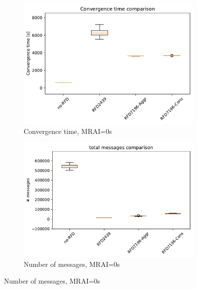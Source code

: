 \begin{figure}[H]
     \centering
     \begin{subfigure}[b]{0.325\textwidth}
         \centering
         \includegraphics[width=\textwidth]{images/RFD/miceVSelephants/MultiMRAI/0/elephants/cisco_1000MRAI0_rfd_comparison_time_boxplot.pdf}
         \caption{\scriptsize Convergence time, MRAI=0s}
         \label{fig:1000_RFD_MRAI0_time_elephant}
     \end{subfigure}
     \hfill
     \begin{subfigure}[b]{0.325\textwidth}
         \centering
         \includegraphics[width=\textwidth]{images/RFD/miceVSelephants/MultiMRAI/0/elephants/cisco_1000MRAI0_rfd_comparison_messages_boxplot.pdf}
         \caption{\scriptsize Number of messages, MRAI=0s}
         \label{fig:1000_RFD_MRAI0_messages_elephant}
     \end{subfigure}

\end{figure}
